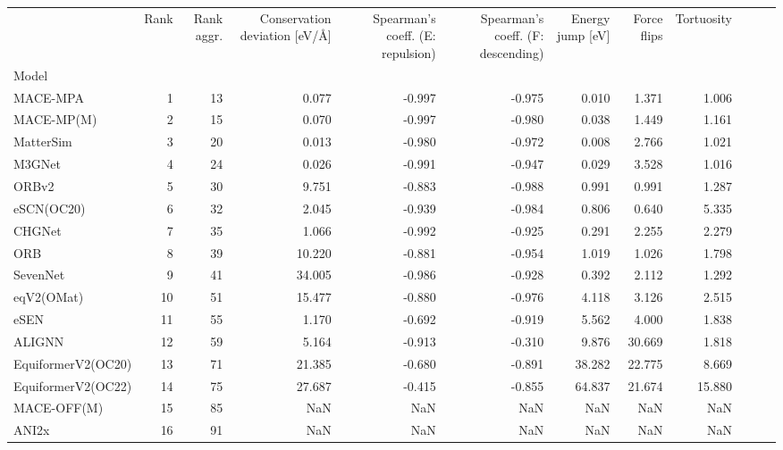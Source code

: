 \begin{tabular}{lrrrrrrrrrrr}
\toprule
 & Rank & Rank aggr. & Conservation deviation [eV/Å] & Spearman's coeff. (E: repulsion) & Spearman's coeff. (F: descending) & Energy jump [eV] & Force flips & Tortuosity \\
Model &  &  &  &  &  &  &  &  \\
\midrule
MACE-MPA & 1 & 13 & 0.077 & -0.997 & -0.975 & 0.010 & 1.371 & 1.006 \\
MACE-MP(M) & 2 & 15 & 0.070 & -0.997 & -0.980 & 0.038 & 1.449 & 1.161 \\
MatterSim & 3 & 20 & 0.013 & -0.980 & -0.972 & 0.008 & 2.766 & 1.021 \\
M3GNet & 4 & 24 & 0.026 & -0.991 & -0.947 & 0.029 & 3.528 & 1.016 \\
ORBv2 & 5 & 30 & 9.751 & -0.883 & -0.988 & 0.991 & 0.991 & 1.287 \\
eSCN(OC20) & 6 & 32 & 2.045 & -0.939 & -0.984 & 0.806 & 0.640 & 5.335 \\
CHGNet & 7 & 35 & 1.066 & -0.992 & -0.925 & 0.291 & 2.255 & 2.279 \\
ORB & 8 & 39 & 10.220 & -0.881 & -0.954 & 1.019 & 1.026 & 1.798 \\
SevenNet & 9 & 41 & 34.005 & -0.986 & -0.928 & 0.392 & 2.112 & 1.292 \\
eqV2(OMat) & 10 & 51 & 15.477 & -0.880 & -0.976 & 4.118 & 3.126 & 2.515 \\
eSEN & 11 & 55 & 1.170 & -0.692 & -0.919 & 5.562 & 4.000 & 1.838 \\
ALIGNN & 12 & 59 & 5.164 & -0.913 & -0.310 & 9.876 & 30.669 & 1.818 \\
EquiformerV2(OC20) & 13 & 71 & 21.385 & -0.680 & -0.891 & 38.282 & 22.775 & 8.669 \\
EquiformerV2(OC22) & 14 & 75 & 27.687 & -0.415 & -0.855 & 64.837 & 21.674 & 15.880 \\
MACE-OFF(M) & 15 & 85 & NaN & NaN & NaN & NaN & NaN & NaN \\
ANI2x & 16 & 91 & NaN & NaN & NaN & NaN & NaN & NaN \\
\bottomrule
\end{tabular}
